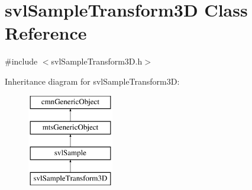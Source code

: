 \hypertarget{classsvl_sample_transform3_d}{}\section{svl\+Sample\+Transform3\+D Class Reference}
\label{classsvl_sample_transform3_d}


{\ttfamily \#include $<$svl\+Sample\+Transform3\+D.\+h$>$}

Inheritance diagram for svl\+Sample\+Transform3\+D\+:\begin{figure}[H]
\begin{center}
\leavevmode
\includegraphics[height=4.000000cm]{d0/df2/classsvl_sample_transform3_d}
\end{center}
\end{figure}
